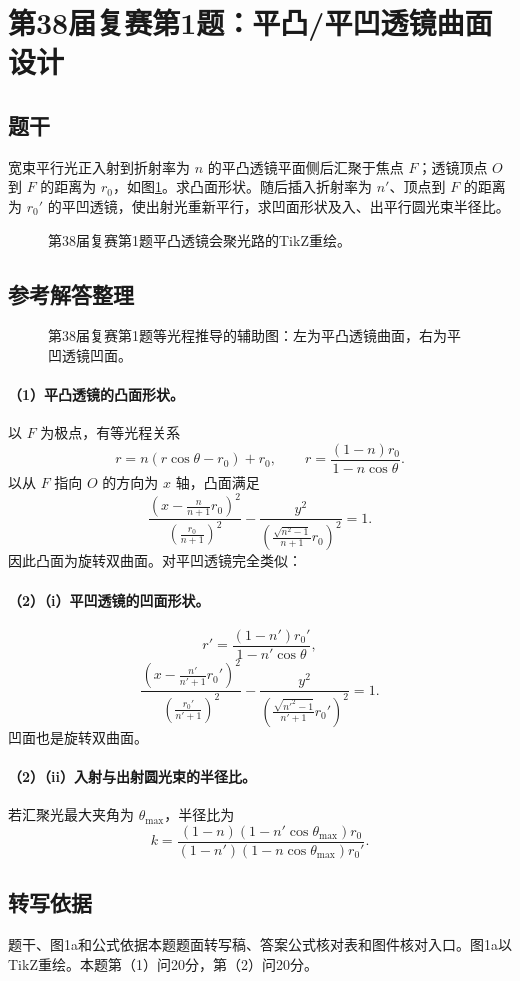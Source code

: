 \section{第38届复赛第1题：平凸/平凹透镜曲面设计}
\subsection{题干}
宽束平行光正入射到折射率为 $n$ 的平凸透镜平面侧后汇聚于焦点 $F$；透镜顶点 $O$ 到 $F$ 的距离为 $r_0$，如图\ref{fig:cpho38q01}。求凸面形状。随后插入折射率为 $n'$、顶点到 $F$ 的距离为 $r_0'$ 的平凹透镜，使出射光重新平行，求凹面形状及入、出平行圆光束半径比。
\begin{figure}[htbp]\centering\caption{第38届复赛第1题平凸透镜会聚光路的TikZ重绘。}\label{fig:cpho38q01}\end{figure}
\subsection{参考解答整理}
\begin{figure}[htbp]\centering
\caption{第38届复赛第1题等光程推导的辅助图：左为平凸透镜曲面，右为平凹透镜凹面。}\label{fig:cpho38q01solution}\end{figure}
\paragraph{（1）平凸透镜的凸面形状。}
以 $F$ 为极点，有等光程关系
\[
r=n(r\cos\theta-r_0)+r_0,
\qquad r=\frac{(1-n)r_0}{1-n\cos\theta}.
\]
以从 $F$ 指向 $O$ 的方向为 $x$ 轴，凸面满足
\[
\boxed{\frac{\left(x-\frac{n}{n+1}r_0\right)^2}{\left(\frac{r_0}{n+1}\right)^2}-\frac{y^2}{\left(\frac{\sqrt{n^2-1}}{n+1}r_0\right)^2}=1.}
\]
因此凸面为旋转双曲面。对平凹透镜完全类似：
\paragraph{（2）（i）平凹透镜的凹面形状。}
\[
r'=\frac{(1-n')r_0'}{1-n'\cos\theta},
\]
\[
\boxed{\frac{\left(x-\frac{n'}{n'+1}r_0'\right)^2}{\left(\frac{r_0'}{n'+1}\right)^2}-\frac{y^2}{\left(\frac{\sqrt{n'^2-1}}{n'+1}r_0'\right)^2}=1.}
\]
凹面也是旋转双曲面。

\paragraph{（2）（ii）入射与出射圆光束的半径比。}
若汇聚光最大夹角为 $\theta_{\max}$，半径比为
\[
\boxed{k=\frac{(1-n)(1-n'\cos\theta_{\max})r_0}{(1-n')(1-n\cos\theta_{\max})r_0'}.}
\]
\subsection{转写依据}
题干、图1a和公式依据本题题面转写稿、答案公式核对表和图件核对入口。图1a以TikZ重绘。本题第（1）问20分，第（2）问20分。
